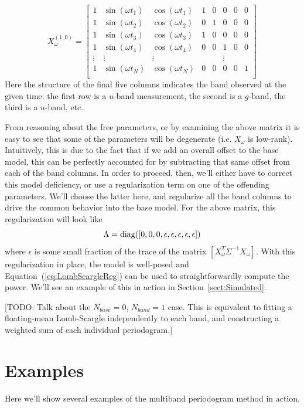 \documentclass[12pt,preprint]{aastex}
\newcommand{\todo}[1]{{\color{red} [TODO: #1]}}
\newcommand{\Eq}[1]{Equation~(\ref{eq:#1})}
\newcommand{\eq}[1]{\Eq{#1}}
\newcommand{\Sect}[1]{Section~\ref{sect:#1}}
\newcommand{\sect}[1]{\Sect{#1}}
\begin{document}
\begin{equation}
X_\omega^{(1,0)} = \left[
\begin{array}{cccccccc}
1 & \sin(\omega t_1) & \cos(\omega t_1) & 1 & 0 & 0 & 0 & 0\\
1 & \sin(\omega t_2) & \cos(\omega t_2) & 0 & 1 & 0 & 0 & 0\\
1 & \sin(\omega t_3) & \cos(\omega t_3) & 1 & 0 & 0 & 0 & 0\\
1 & \sin(\omega t_4) & \cos(\omega t_4) & 0 & 0 & 1 & 0 & 0\\
\vdots & \vdots & \vdots & & & \vdots & &\\
1 & \sin(\omega t_N) & \cos(\omega t_N) & 0 & 0 & 0 & 0 & 1\\
\end{array}
\right]
\end{equation}
Here the structure of the final five columns indicates the band observed at the given time: the first row is a $u$-band measurement, the second is a $g$-band, the third is a $u$-band, etc.

From reasoning about the free parameters, or by examining the above matrix it is easy to see that some of the parameters will be degenerate (i.e. $X_\omega$ is low-rank). Intuitively, this is due to the fact that if we add an overall offset to the base model, this can be perfectly accounted for by subtracting that same offset from each of the band columns. In order to proceed, then, we'll either have to correct this model deficiency, or use a regularization term on one of the offending parameters. We'll choose the latter here, and regularize all the band columns to drive the common behavior into the base model. For the above matrix,
this regularization will look like
\begin{equation}
  \Lambda = {\rm diag}([0, 0, 0, \epsilon, \epsilon, \epsilon, \epsilon, \epsilon])
\end{equation}
where $\epsilon$ is some small fraction of the trace of the matrix $[X_\omega^T\Sigma^{-1}X_\omega]$. With this regularization in place, the model is well-posed and \eq{LombScargleReg} can be used to straightforwardly compute the power. We'll see an example of this in action in \sect{Simulated}.

\todo{Talk about the $N_{base} = 0$, $N_{band} = 1$ case. This is equivalent to fitting a floating-mean Lomb-Scargle independently to each band, and constructing a weighted sum of each individual periodogram.}

\section{Examples}
Here we'll show several examples of the multiband periodogram method in action.
\end{document}
